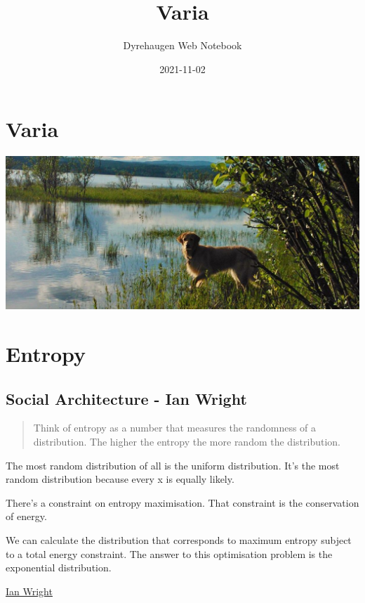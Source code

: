 \documentclass[
]{book}
\title{Varia}
\author{Dyrehaugen Web Notebook}
\date{2021-11-02}
\begin{document}
\maketitle

{
\setcounter{tocdepth}{1}
\tableofcontents
}
\hypertarget{varia}{%
\chapter{Varia}\label{varia}}

\includegraphics{fig/zelda.jpg}

\hypertarget{entropy}{%
\chapter{Entropy}\label{entropy}}

\hypertarget{social-architecture---ian-wright}{%
\section{Social Architecture - Ian Wright}\label{social-architecture---ian-wright}}

\begin{quote}
Think of entropy as a number that measures the randomness of a distribution.
The higher the entropy the more random the distribution.
\end{quote}

The most random distribution of all is the uniform distribution.
It's the most random distribution because every x is equally likely.

There's a constraint on entropy maximisation.
That constraint is the conservation of energy.

We can calculate the distribution that corresponds
to maximum entropy subject to a total energy constraint.
The answer to this optimisation problem is the exponential distribution.

\href{https://ianwrightsite.wordpress.com/2017/11/16/the-social-architecture-of-capitalism/}{Ian Wright}
\end{document}
